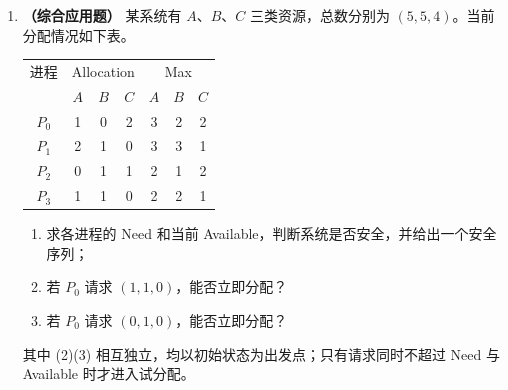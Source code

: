 \begin{enumerate}[resume]
\begin{lstlisting}[language=C]
P1() {
    while (1) {
        data d = produce();
        P(empty1);          // 等 B1 空位
        P(mutex1);          // 独占 B1 的读写指针
        put(B1, d);
        V(mutex1);
        V(full1);           // B1 中数据数加 1
    }
}

P2() {
    while (1) {
        P(full1);           // 等 B1 中有数据
        P(mutex1);
        data d = get(B1);
        V(mutex1);
        V(empty1);          // 归还 B1 的一个空位
        d = process(d);
        P(empty2);          // 等 B2 空位
        P(mutex2);
        put(B2, d);
        V(mutex2);
        V(full2);           // B2 中数据数加 1
    }
}

P3() {
    while (1) {
        P(full2);           // 等 B2 中有数据
        P(mutex2);
        data d = get(B2);
        V(mutex2);
        V(empty2);          // 归还 B2 的一个空位
        consume(d);
    }
}
\end{lstlisting}
次序理由：$P$ 操作必须“先资源、后互斥”。若先取 \texttt{mutex} 再等 \texttt{empty}，缓冲区满时进程会占着锁阻塞，持有空位的消费者无法进入，形成死锁。$V$ 操作“先互斥、后资源”，先释放锁再唤醒对方，可减少无谓的等待。$P_2$ 在加工前就执行 \texttt{V(empty1)}，是为了尽早把 $B_1$ 的空位还给 $P_1$，让上游不必等加工完成，提高流水线的并行度；这一次序不影响正确性。\else \answerarea[16] \fi

\vspace{8pt}

\item \textbf{（综合应用题）} 某系统有 $A$、$B$、$C$ 三类资源，总数分别为 $(5,5,4)$。当前分配情况如下表。
\begin{center}
\begin{tabular}{|c|ccc|ccc|}
\hline
进程 & \multicolumn{3}{c|}{Allocation} & \multicolumn{3}{c|}{Max} \\
 & $A$ & $B$ & $C$ & $A$ & $B$ & $C$ \\
\hline
$P_0$ & 1 & 0 & 2 & 3 & 2 & 2 \\
$P_1$ & 2 & 1 & 0 & 3 & 3 & 1 \\
$P_2$ & 0 & 1 & 1 & 2 & 1 & 2 \\
$P_3$ & 1 & 1 & 0 & 2 & 2 & 1 \\
\hline
\end{tabular}
\end{center}
\begin{enumerate}
    \item 求各进程的 Need 和当前 Available，判断系统是否安全，并给出一个安全序列；
    \item 若 $P_0$ 请求 $(1,1,0)$，能否立即分配？
    \item 若 $P_0$ 请求 $(0,1,0)$，能否立即分配？
\end{enumerate}
其中 (2)(3) 相互独立，均以初始状态为出发点；只有请求同时不超过 Need 与 Available 时才进入试分配。


\end{enumerate}
